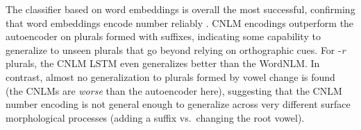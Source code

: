 

The classifier based on word embeddings is overall the most
successful, confirming that word embeddings encode number reliably
\cite{Mikolov:etal:2013a}.  CNLM encodings outperform the autoencoder
on plurals formed with suffixes, indicating some capability to
generalize to unseen plurals that go beyond relying on orthographic
cues.  For -\emph{r} plurals, the CNLM LSTM even generalizes better
than the WordNLM.  In contrast, almost no generalization to plurals
formed by vowel change is found (the CNLMs are \emph{worse} than the
autoencoder here), suggesting that the CNLM number encoding is not
general enough to generalize across very different surface
morphological processes (adding a suffix vs.~changing the root vowel).
